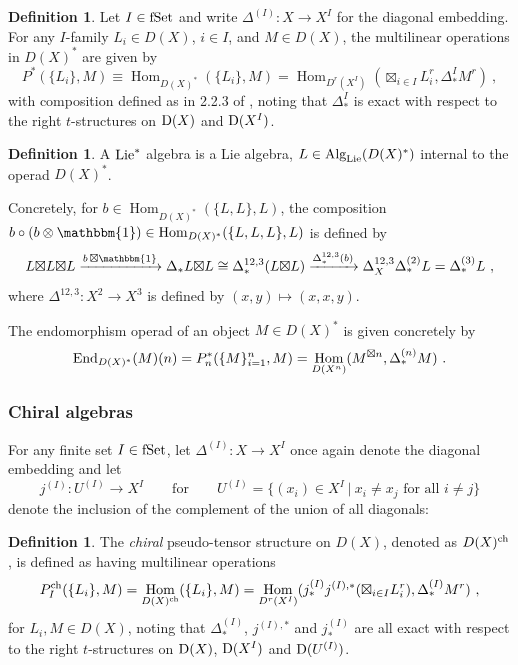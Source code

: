 \documentclass[11pt]{amsart}
\numberwithin{equation}{section}
\theoremstyle{definition}
\newtheorem{defn}[theo]{Definition}
\newcommand{\OEnd}{{\textup{End}}}
\DeclareMathOperator{\Hom}{Hom}
\newcommand{\Alg}{{\textup{Alg}}}
\newcommand{\Lie}{{\textup{Lie}}}
\newcommand{\ch}{{\textup{ch}}}
\newcommand{\boxt}{{{\boxtimes }}}
\newcommand{\fset}{{\textup{fSet}}}
\newcommand{\0}{{\textbf{0}}}
\newcommand{\Dd}{{\textup{D}}}
\newcommand{\DD}{{D}}
\newcommand{\id}{{\textup{id}}}
\def\ch{{\rm ch}}
\def \id{\mathbbm{1}}
\begin{document}
\begin{defn} Let $I\in \fset$ and write $\Delta^{(I)}:X\rightarrow X^I$ for the diagonal embedding. For any $I$-family $L_i\in\DD(X)$, $i\in I$, and $M\in\DD(X)$, the multilinear operations in $\DD(X)^*$ are given by
\[
 P^*(\{L_i\}, M)\equiv\Hom_{\DD(X)^*}(\{L_i\}, M) = \Hom_{\DD^r(X^I)}(\boxt_{i\in I} L_i^r , \Delta^I_* M^r) \ , 
\]
with composition defined as in 2.2.3 of \cite{BD1}, noting that $\Delta^I_*$ is exact with respect to the right $t$-structures on $\Dd(X)$ and $\Dd(X^I)$.
\end{defn}

\begin{defn}
	A $\Lie^*$ algebra is a Lie algebra, $L\in \Alg_{\Lie}(\DD(X)^*)$ internal to the operad $\DD(X)^*$.
\end{defn}

Concretely, for $b\in \Hom_{\DD(X)^*}(\{L,L\},L)$, the composition $b\circ (b\otimes \id) \in \Hom_{\DD(X)^*}(\{L,L,L\},L)$ is defined by
\[
L\boxt L\boxt L  \xrightarrow{ b\,\boxt \id} \Delta_*L\boxt L \cong \Delta^{12,3}_*(L\boxt L) \xrightarrow{ \Delta^{12,3}_*(b)} \Delta^{12,3}_X\Delta^{(2)}_*L=\Delta^{(3)}_* L~,
\]
where $\Delta^{12,3}:X^2\to X^3$ is defined by $(x,y)\mapsto (x,x,y)$.

The endomorphism operad of an object $M\in \DD(X)^*$ is given concretely by
\[ \OEnd_{\DD(X)^*}(M)(n) =P_n^*(\{ M\}_{i=1}^n,M)= \Hom_{\DD(X^n)}(M^{\boxtimes n} , \Delta^{(n)}_* M) \ .  \]






\subsubsection{Chiral algebras}

For any finite set $I\in \fset$, let $\Delta^{(I)}:X\to X^I$ once again denote the diagonal embedding and let
\[ 
j^{(I)}:U^{(I)} \to X^I \qquad \text{for}\qquad U^{(I)}=\{ (x_i) \in X^I \ | \ x_i \neq x_j  \text{ for all } i\neq j \} 
\]
denote the inclusion of the complement of the union of all diagonals:

\begin{defn} The \emph{chiral} pseudo-tensor structure on $\DD(X)$, denoted as $\DD(X)^\ch$, is defined as having multilinear operations
	\[ 
	P^\ch_I(\{L_i\}, M) =\Hom_{\DD(X)^\ch}(\{L_i\}, M) = \Hom_{\DD^r(X^I)}(j^{(I)}_*j^{(I),*} (\boxt_{i\in I} L_i^r) , \Delta^{(I)}_* M^r) ~,
	\]
	for $L_i,M\in \DD(X)$, noting that $\Delta^{(I)}_*$, $j^{(I),*}$ and $j^{(I)}_*$ are all exact with respect to the right $t$-structures on $\Dd(X)$, $\Dd(X^I)$ and $\Dd(U^{(I)})$.
\end{defn}
\end{document}
